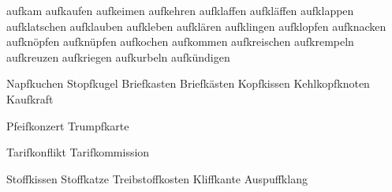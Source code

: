 \begin{itemize}
aufkam aufkaufen aufkeimen aufkehren aufklaffen aufkläffen aufklappen aufklatschen aufklauben aufkleben aufklären aufklingen aufklopfen aufknacken aufknöpfen aufknüpfen aufkochen aufkommen aufkreischen aufkrempeln aufkreuzen aufkriegen aufkurbeln aufkündigen

Napfkuchen Stopfkugel Briefkasten Briefkästen Kopfkissen
 Kehlkopfknoten Kaufkraft

Pfeifkonzert Trumpfkarte

Tarifkonflikt Tarifkommission 

Stoffkissen Stoffkatze Treibstoffkosten Kliffkante Auspuffklang

\end{itemize}



